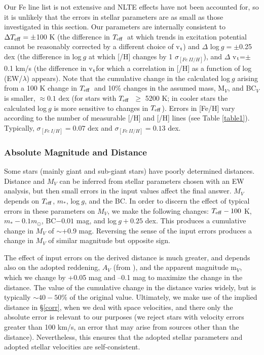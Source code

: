 \documentclass[12pt,preprint]{aastex}
\def\teff{\mbox{$T_{\rm {eff}}$}}
\def\vt{\mbox{v$_{\rm t}$}}
\begin{document}
{ Our Fe line list is not extensive and NLTE effects have not been accounted for, so it is unlikely that the errors in stellar parameters are as small as those investigated in this section.  Our parameters are internally consistent to $\Delta \teff=\pm$100 K (the difference in \teff~at which trends in excitation potential cannot be reasonably corrected by a different choice of \vt) and $\Delta$ log$~g= \pm$0.25 dex (the difference in log$~g$ at which [/H] changes by 1 $\sigma_{[Fe~II/H]}$), and  $\Delta$ \vt=$\pm$0.1 km/s (the difference in \vt for which a correlation in [/H] as a function of log (EW/$\lambda$) appears).  Note that the cumulative change in the calculated log$~g$ arising from a 100 K change in \teff~and 10\% changes in the assumed mass, M$_{V}$, and BC$_{V}$ is smaller, $\approx 0.1$ dex (for stars with \teff~$\geq$ 5200 K; in cooler stars the calculated log$~g$ is more sensitive to changes in \teff).   Errors in [Fe/H] vary according to the number of measurable [/H] and [/H] lines (see Table \ref{table1}).  Typically, $\sigma_{[Fe~I/H]}=0.07$ dex and $\sigma_{[Fe~II/H]}=0.13$ dex.  

\subsubsection{Absolute Magnitude and Distance \label{dist}}

Some stars (mainly giant and sub-giant stars) have poorly determined distances.  Distance and $M_V$ can be inferred from stellar parameters chosen with an EW analysis, but then small errors in the input values affect the final answer.  $M_V$ depends on \teff, $m_*$, log$~g$, and the BC.  In order to discern the effect of typical errors in these parameters on $M_V$, we make the following changes: $\teff-100$ K, $m_*-0.1 m_{\odot}$, BC$-0.01$ mag,  and log$~g+0.25$ dex.  This produces a cumulative change in $M_V$ of $\sim$+0.9 mag.  Reversing the sense of the input errors produces a change in $M_V$  of similar magnitude but opposite sign.  

The effect of input errors on the derived distance is much greater, and depends also on the adopted reddening, $A_V$ (from \citealt{Schlegel1998}), and the apparent magnitude m$_V$,  which we change by +0.05 mag  and --0.1 mag to maximize the change in the distance.  The value of the cumulative change in the distance  varies widely, but is typically $\sim 40-50\%$ of the original value.  Ultimately, we make use of the  implied distance in \S \ref{corr}, when we deal with space velocities, and there only the absolute error is relevant to our purposes (we reject stars with velocity errors greater than 100 km/s, an error that may arise  from sources other than the distance).   Nevertheless, this ensures that the adopted stellar parameters and adopted stellar velocities are self-consistent. 

}
\end{document}
